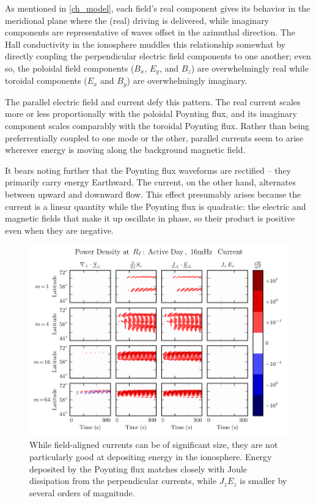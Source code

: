 As mentioned in \cref{ch_model}, each field's real component gives its behavior in the meridional plane where the (real) driving is delivered, while imaginary components are representative of waves offset in the azimuthal direction. The Hall conductivity in the ionosphere muddles this relationship somewhat by directly coupling the perpendicular electric field components to one another; even so, the poloidal field components ($B_x$, $E_y$, and $B_z$) are overwhelmingly real while toroidal components ($E_x$ and $B_y$) are overwhelmingly imaginary. 

The parallel electric field and current defy this pattern. The real current scales more or less proportionally with the poloidal Poynting flux, and its imaginary component scales comparably with the toroidal Poynting flux. Rather than being preferrentially coupled to one mode or the other, parallel currents seem to arise wherever energy is moving along the background magnetic field. 

It bears noting further that the Poynting flux waveforms are rectified -- they primarily carry energy Earthward. The current, on the other hand, alternates between upward and downward flow. This effect presumably arises because the current is a linear quantity while the Poynting flux is quadratic: the electric and magnetic fields that make it up oscillate in phase, so their product is positive even when they are negative. 

\begin{figure}[!htb]
    \centering
    \includegraphics[width=\textwidth]{figures/power_density.pdf}
    \caption[Power Density at the Ionosphere]{
      While field-aligned currents can be of significant size, they are not particularly good at depositing energy in the ionosphere. Energy deposited by the Poynting flux matches closely with Joule dissipation from the perpendicular currents, while $J_z E_z$ is smaller by several orders of magnitude. 
    }
    \label{fig_power_density}
\end{figure}

